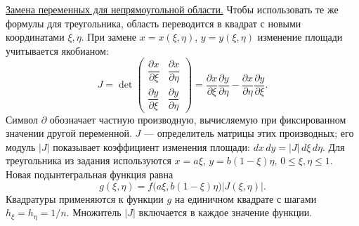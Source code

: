 \documentclass[12pt,a4paper]{article}
\begin{document}
\underline{Замена переменных для непрямоугольной области.}
Чтобы использовать те же формулы для треугольника, область переводится
в квадрат с новыми координатами $\xi,\eta$. При замене
$x=x(\xi,\eta)$, $y=y(\xi,\eta)$ изменение площади учитывается якобианом:
\[
J=\det\begin{pmatrix}
\dfrac{\partial x}{\partial\xi} & \dfrac{\partial x}{\partial\eta}\\[6pt]
\dfrac{\partial y}{\partial\xi} & \dfrac{\partial y}{\partial\eta}
\end{pmatrix}
=\frac{\partial x}{\partial\xi}\frac{\partial y}{\partial\eta}
-\frac{\partial x}{\partial\eta}\frac{\partial y}{\partial\xi}.
\]
Символ $\partial$ обозначает частную производную, вычисляемую при фиксированном
значении другой переменной. $J$ --- определитель матрицы этих производных;
его модуль $|J|$ показывает коэффициент изменения площади:
$dx\,dy=|J|\,d\xi\,d\eta$.
Для треугольника из задания используются $x=a\xi$, $y=b(1-\xi)\eta$,
$0\leq\xi,\eta\leq1$. Новая подынтегральная функция равна
\[
g(\xi,\eta)=f\bigl(a\xi,b(1-\xi)\eta\bigr)|J(\xi,\eta)|.
\]
Квадратуры применяются к функции $g$ на единичном квадрате с шагами
$h_\xi=h_\eta=1/n$. Множитель $|J|$ включается в каждое значение функции.
\end{document}
